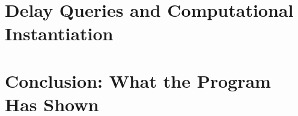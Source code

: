 \documentclass[12pt, oneside]{book}
\theoremstyle{definition}
\theoremstyle{remark}
\begin{document}



\chapter{Delay Queries and Computational Instantiation}
\label{chap:paper-three}




\chapter*{Conclusion: What the Program Has Shown}
\label{chap:conclusion}



\backmatter
\end{document}
